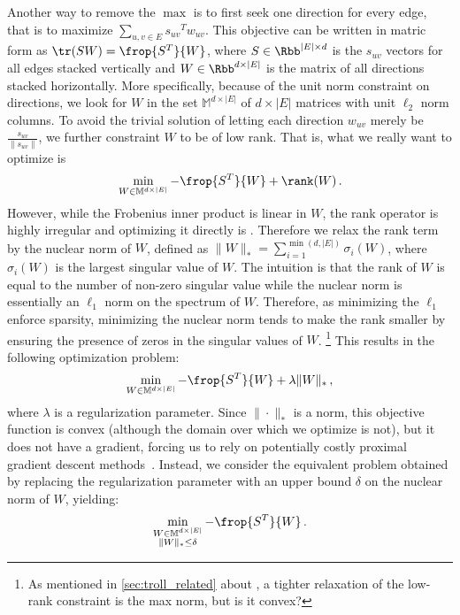 Another way to remove the $\max$ is to first seek one direction for every edge, that is to maximize
$\sum_{u,v\in E} {s_{uv}}^T w_{uv}$. This objective can be written in matric form as $\tr(SW) =
\frop{S^T}{W}$, where $S \in \Rbb^{|E| \times d}$ is the $s_{uv}$ vectors for all edges stacked
vertically and $W \in \Rbb^{d \times |E|}$ is the matrix of all directions stacked horizontally.
More specifically, because of the unit norm constraint on directions, we look for $W$ in the set
$\mathbb{M}^{d\times |E|}$ of $d\times |E|$ matrices with unit $\ell_2$ norm columns. To avoid the
trivial solution of letting each direction $w_{uv}$ merely be $\frac{s_{uv}}{\|s_{uv}\|}$, we
further constraint $W$ to be of low rank. That is, what we really want to optimize is \[\min_{W\in
\mathbb{M}^{d\times |E|}} -\frop{S^T}{W} + \rank(W)\,.\] However, while the Frobenius inner product is
linear in $W$, the rank operator is highly irregular and optimizing it directly is \NPc{}. Therefore
we relax the rank term by the nuclear norm of $W$, defined as $\|W\|_* = \sum_{i=1}^{\min(d,|E|)}
\sigma_i(W)$, where $\sigma_i(W)$ is the \ith{} largest singular value of $W$. The intuition is
that the rank of $W$ is
equal to the number of non-zero singular value while the nuclear norm is essentially an $\ell_1$ norm on
the spectrum of $W$. Therefore, as minimizing the $\ell_1$ enforce sparsity, minimizing the nuclear
norm tends to make the rank smaller by ensuring the presence of zeros in the singular values of $W$.
\footnote{As mentioned in \autoref{sec:troll_related} about \autocite{OnlineCompletion17}, a tighter
relaxation of the low-rank constraint is the max norm, but is it convex?} This
results in the following optimization problem: \[\min_{W\in \mathbb{M}^{d\times |E|}} -\frop{S^T}{W}
+ \lambda \|W\|_*\,,\] where $\lambda$ is a regularization parameter. Since $\|\cdot\|_*$ is a norm, this
objective function is convex (although the domain over which we optimize is not), but it does not
have a gradient, forcing us to rely on potentially costly proximal gradient descent
methods~\autocite{Parikh2013a}. Instead, we consider the equivalent problem obtained by replacing
the regularization parameter with an upper bound $\delta$ on the nuclear norm of $W$, yielding:
\begin{equation*}
  \min_{\substack{W\in \mathbb{M}^{d\times |E|} \\ \|W\|_* \leq \delta}} -\frop{S^T}{W}\,.
\end{equation*}


